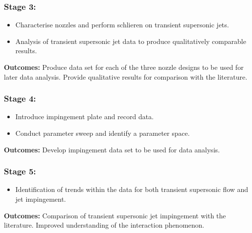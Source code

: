 \subsubsection*{Stage 3:}
\begin{itemize}
	\item Characterise nozzles and perform schlieren on transient supersonic jets.
	\item Analysis of transient supersonic jet data to produce qualitatively comparable results.
\end{itemize}
\textbf{Outcomes:} Produce data set for each of the three nozzle designs to be used for later data analysis. Provide qualitative results for comparison with the literature.

\subsubsection*{Stage 4:}
\begin{itemize}
	\item Introduce impingement plate and record data.
	\item Conduct parameter sweep and identify a parameter space.
\end{itemize}
\textbf{Outcomes:} Develop impingement data set to be used for data analysis.

\subsubsection*{Stage 5:}                                 
\begin{itemize}
	\item Identification of trends within the data for both transient supersonic flow and jet impingement.
\end{itemize}
\textbf{Outcomes:} Comparison of transient supersonic jet impingement with the literature. Improved understanding of the interaction phenomenon.

